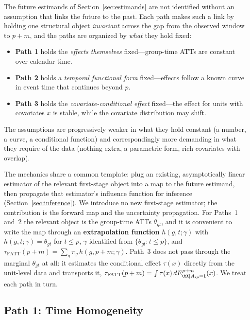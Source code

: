 \documentclass{article}
\begin{document}
The future estimands of Section~\ref{sec:estimands} are not identified without an assumption that links the future to the past. Each path makes such a link by holding one structural object \emph{invariant} across the gap from the observed window to $p+m$, and the paths are organized by \emph{what} they hold fixed:
\begin{itemize}
\item \textbf{Path 1} holds the \emph{effects themselves} fixed---group-time ATTs are constant over calendar time.
\item \textbf{Path 2} holds a \emph{temporal functional form} fixed---effects follow a known curve in event time that continues beyond $p$.
\item \textbf{Path 3} holds the \emph{covariate-conditional effect} fixed---the effect for units with covariates $x$ is stable, while the covariate distribution may shift.
\end{itemize}
The assumptions are progressively weaker in what they hold constant (a number, a curve, a conditional function) and correspondingly more demanding in what they require of the data (nothing extra, a parametric form, rich covariates with overlap).

The mechanics share a common template: plug an existing, asymptotically linear estimator of the relevant first-stage object into a map to the future estimand, then propagate that estimator's influence function for inference (Section~\ref{sec:inference}). We introduce no new first-stage estimator; the contribution is the forward map and the uncertainty propagation. For Paths~1 and~2 the relevant object is the group-time ATTs $\theta_{gt}$, and it is convenient to write the map through an \textbf{extrapolation function} $h(g,t;\gamma)$ with $h(g,t;\gamma)=\theta_{gt}$ for $t \leq p$, $\gamma$ identified from $\{\theta_{gt}: t\leq p\}$, and $\tau_{\text{FATT}}(p+m) = \sum_g \pi_g\, h(g,p+m;\gamma)$. Path~3 does not pass through the marginal $\theta_{gt}$ at all: it estimates the conditional effect $\tau(x)$ directly from the unit-level data and transports it, $\tau_{\text{FATT}}(p+m) = \int \tau(x)\, dF^{p+m}_{\bX \mid A_{ip}=1}(x)$. We treat each path in turn.

\subsection{Path 1: Time Homogeneity}
\label{sec:path1}

\end{document}
